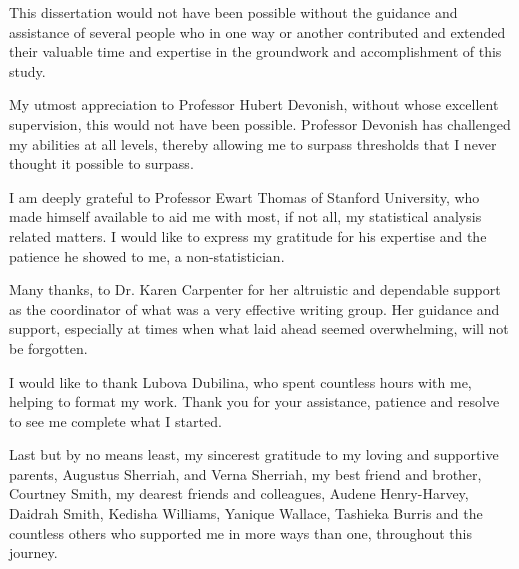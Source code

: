 \begin{refsection}

This dissertation would not have been possible without the guidance and assistance of several people who in one way or another contributed and extended their valuable time and expertise in the groundwork and accomplishment of this study.

My utmost appreciation to Professor Hubert Devonish, without whose excellent supervision, this would not have been possible. Professor Devonish has challenged my abilities at all levels, thereby allowing me to surpass thresholds that I never thought it possible to surpass.

I am deeply grateful to Professor Ewart Thomas of Stanford University, who made himself available to aid me with most, if not all, my statistical analysis related matters. I would like to express my gratitude for his expertise and the patience he showed to me, a non-statistician.

Many thanks, to Dr. Karen Carpenter for her altruistic and dependable support as the coordinator of what was a very effective writing group. Her guidance and support, especially at times when what laid ahead seemed overwhelming, will not be forgotten.

I would like to thank Lubova Dubilina, who spent countless hours with me, helping to format my work. Thank you for your assistance, patience and resolve to see me complete what I started.

Last but by no means least, my sincerest gratitude to my loving and supportive parents, Augustus Sherriah, and Verna Sherriah, my best friend and brother, Courtney Smith, my dearest friends and colleagues, Audene Henry-Harvey, Daidrah Smith, Kedisha Williams, Yanique Wallace, Tashieka Burris and the countless others who supported me in more ways than one, throughout this journey.

\printbibliography[heading=subbibliography]
\end{refsection}

